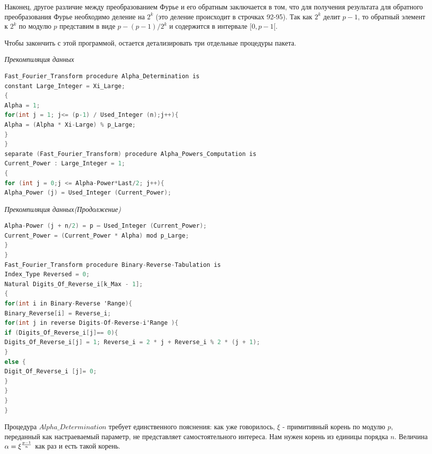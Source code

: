 \documentclass{mai_book}
\begin{document}
	Наконец, другое различие между преобразованием Фурье и его обратным заключается в том, что для получения результата для обратного преобразования Фурье необходимо деление на $2^k$ (это деление происходит  в строчках 92-95). Так как $2^k$ делит $p-1$, то обратный элемент к $2^k$ по модулю $p$ представим в виде $p-(p-1)/2^k$ и содержится в интервале $[0,p-1[$.
	
	Чтобы закончить с этой программой, остается детализировать три отдельные процедуры пакета.
	
	\textit{Прекомпиляция данных}
\begin{lstlisting}[language=C,
basicstyle=\scriptsize,
linewidth=7cm,
belowskip=-1em,
mathescape=true]
Fast_Fourier_Transform procedure Alpha_Determination is
constant Large_Integer = Xi_Large;
{
Alpha = 1;
for(int j = 1; j<= (p-1) / Used_Integer (n);j++){
Alpha = (Alpha * Xi-Large) % p_Large;
}
}
separate (Fast_Fourier_Transform) procedure Alpha_Powers_Computation is
Current_Power : Large_Integer = 1;
{
for (int j = 0;j <= Alpha-Power*Last/2; j++){
Alpha_Power (j) = Used_Integer (Current_Power);

\end{lstlisting}
	
	\newpage
	
\textit{Прекомпиляция данных(Продолжение)}
\begin{lstlisting}[language=C,
basicstyle=\scriptsize,
linewidth=7cm,
belowskip=-1em,
mathescape=true]
Alpha-Power (j + n/2) = р – Used_Integer (Current_Power);
Current_Power = (Current_Power * Alpha) mod p_Large;
}
}
Fast_Fourier_Transform procedure Binary-Reverse-Tabulation is
Index_Type Reversed = 0;
Natural Digits_Of_Reverse_i[k_Max - 1];
{
for(int i in Binary-Reverse 'Range){
Binary_Reverse[i] = Reverse_i;
for(int j in reverse Digits-Of-Reverse-i'Range ){
if (Digits_Of_Reverse_i[j]== 0){
Digits_Of_Reverse_i[j] = 1; Reverse_i = 2 * j + Reverse_i % 2 * (j + 1);
}
else {
Digit_Of_Reverse_i [j]= 0;
}
}
}
}
\end{lstlisting}

\bigskip
	
	
	Процедура $Alpha \_ Determination$ требует единственного пояснения: как уже говорилось, $\xi$ - примитивный корень по модулю $p$, переданный как настраеваемый параметр, не представляет самостоятельного интереса. Нам нужен корень из единицы порядка $n$. Величина $\alpha = \xi^{p-1 \over n}$ как раз и есть такой корень.
	
\end{document}

